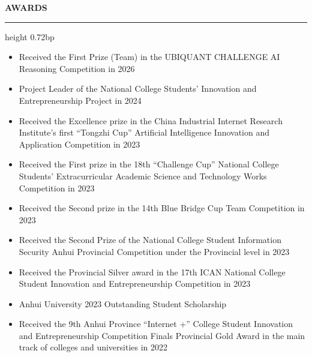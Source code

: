 \documentclass[10pt,a4paper]{article}
\newcommand{\sectionrule}[1]{%
  \par\vspace{1.80bp}\noindent\textbf{#1}\par\vspace{2.62bp}%
  \hrule height 0.72bp\vspace{1.80bp}%
}
\let\compactsectionrule\sectionrule
\newenvironment{cvitems}{%
  \begin{itemize}[leftmargin=14.20bp,labelwidth=4.20bp,labelsep=10.00bp,align=left,
    topsep=0bp,itemsep=0bp,parsep=0bp,partopsep=0bp,label={\textbullet}]
}{\end{itemize}}
\begin{document}
\compactsectionrule{AWARDS}
\begin{cvitems}
\item Received the First Prize (Team) in the UBIQUANT CHALLENGE AI Reasoning Competition in 2026
\item Project Leader of the National College Students' Innovation and Entrepreneurship Project in 2024
\item Received the Excellence prize in the China Industrial Internet Research Institute's first ``Tongzhi Cup'' Artificial Intelligence Innovation and Application Competition in 2023
\item Received the First prize in the 18th ``Challenge Cup'' National College Students' Extracurricular Academic Science and Technology Works Competition in 2023
\item Received the Second prize in the 14th Blue Bridge Cup Team Competition in 2023
\item Received the Second Prize of the National College Student Information Security Anhui Provincial Competition under the Provincial level in 2023
\item Received the Provincial Silver award in the 17th ICAN National College Student Innovation and Entrepreneurship Competition in 2023
\item Anhui University 2023 Outstanding Student Scholarship
\item Received the 9th Anhui Province ``Internet +'' College Student Innovation and Entrepreneurship Competition Finals Provincial Gold Award in the main track of colleges and universities in 2022
\end{cvitems}
\end{document}
